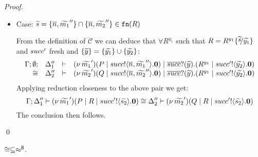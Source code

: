 \begin{proof}
\begin{itemize}
	\item Case: $\widetilde{s} = \{\overline{n}, \widetilde{m_1}''\} \cap \{\overline{n}, \widetilde{m_2}''\} \in \mathtt{fn}(R)$

	\noi From the definition of $\mathcal{C}$ we can deduce that $\forall R^{y_1}$ such that $R = R^{y_1}\subst{\widetilde{s}}{\widetilde{y_1}}$
	and $succ'$ fresh and $\{\widetilde{y}\} = \{\widetilde{y_1}\} \cup \{\widetilde{y_2}\}$:
%
	\[
		\begin{array}{rcll} \Gamma; \emptyset; &\Delta_1''& \vdash& (\nu\, \widetilde{m_1}')(P \;|\; succ ! \langle \overline{n}, \widetilde{m_1}'' \rangle . \mathbf{0}) \;|\; \overline{succ} ? (\widetilde{y}) . (R^{y_1} \;|\; succ' ! \langle \widetilde{y_2} \rangle . \mathbf{0})\\ \cong &\Delta_2''& \vdash &  (\nu\, \widetilde{m_2}')(Q \;|\; succ ! \langle \overline{n}, \widetilde{m_2}'' \rangle . \mathbf{0}) \;|\; \overline{succ} ? (\widetilde{y}) . (R^{y_1} \;|\; succ' ! \langle \widetilde{y_2} \rangle . \mathbf{0}) \end{array}
	\]
%
	\noi Applying reduction closeness to the above pair we get:
%
	\[
		\Gamma; \Delta_1'' \vdash (\nu\, \widetilde{m_1}')(P \;|\; R \;|\; succ' ! \langle \widetilde{s_2} \rangle . \mathbf{0}) \cong \Delta_2'' \vdash (\nu\, \widetilde{m_2}')(Q \;|\; R \;|\; succ' ! \langle \widetilde{s_2} \rangle . \mathbf{0})
	\]
%
	\noi The conclusion then follows.
	    \end{itemize}
	\qed
\end{proof}


\begin{lemma}\rm
	\label{app:lem:cong_is_wb}
	$\cong \subseteq \approx^\mathtt{H}$.
\end{lemma}


